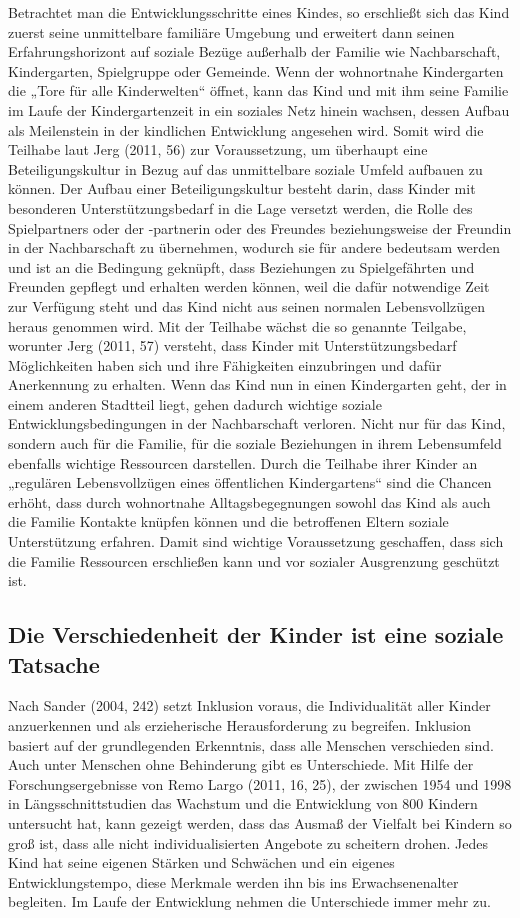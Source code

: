 Betrachtet man die Entwicklungsschritte eines Kindes, so erschließt sich das Kind zuerst seine unmittelbare familiäre Umgebung und erweitert dann seinen Erfahrungshorizont auf soziale Bezüge außerhalb der Familie wie Nachbarschaft, Kindergarten, Spielgruppe oder Gemeinde. Wenn der wohnortnahe Kindergarten die „Tore für alle Kinderwelten“ öffnet, kann das Kind und mit ihm seine Familie im Laufe der Kindergartenzeit in ein soziales Netz hinein wachsen, dessen Aufbau als Meilenstein in der kindlichen Entwicklung angesehen wird. 
Somit wird die Teilhabe laut Jerg (2011, 56) zur Voraussetzung, um überhaupt eine Beteiligungskultur in Bezug auf das unmittelbare soziale Umfeld aufbauen zu können. Der Aufbau einer Beteiligungskultur besteht darin, dass Kinder mit besonderen Unterstützungsbedarf in die Lage versetzt werden, die Rolle des Spielpartners oder der -partnerin oder des Freundes beziehungsweise der Freundin in der Nachbarschaft zu übernehmen, wodurch sie für andere bedeutsam werden und ist an die Bedingung geknüpft, dass  Beziehungen zu Spielgefährten und Freunden gepflegt und erhalten werden können, weil die dafür notwendige Zeit zur Verfügung steht und das Kind nicht aus seinen normalen Lebensvollzügen heraus genommen wird.
Mit der Teilhabe wächst die so genannte Teilgabe, worunter Jerg (2011, 57) versteht, dass Kinder mit Unterstützungsbedarf Möglichkeiten haben sich und ihre Fähigkeiten einzubringen und dafür Anerkennung zu erhalten. 
Wenn das Kind nun in einen Kindergarten geht, der in einem anderen Stadtteil liegt, gehen dadurch wichtige soziale Entwicklungsbedingungen in der Nachbarschaft verloren. Nicht nur für das Kind, sondern auch für die Familie, für die soziale Beziehungen in ihrem Lebensumfeld ebenfalls wichtige Ressourcen darstellen. Durch die Teilhabe ihrer Kinder an „regulären Lebensvollzügen eines öffentlichen Kindergartens“ sind die Chancen erhöht, dass durch wohnortnahe Alltagsbegegnungen sowohl das Kind als auch die Familie Kontakte knüpfen können und die betroffenen Eltern soziale Unterstützung erfahren. Damit sind wichtige Voraussetzung geschaffen, dass sich die Familie Ressourcen erschließen kann und vor sozialer Ausgrenzung geschützt ist. 

\subsection{Die Verschiedenheit der Kinder ist eine soziale Tatsache}\label{sec:heterogenität}
Nach Sander (2004, 242) setzt Inklusion voraus, die Individualität aller Kinder anzuerkennen und als erzieherische Herausforderung zu begreifen. Inklusion basiert auf der grundlegenden Erkenntnis, dass alle Menschen verschieden sind. Auch unter Menschen ohne Behinderung gibt es Unterschiede. Mit Hilfe der Forschungsergebnisse von Remo Largo (2011, 16, 25), der zwischen 1954 und 1998 in Längsschnittstudien das Wachstum und die Entwicklung von 800 Kindern untersucht hat, kann gezeigt werden, dass das Ausmaß der Vielfalt bei Kindern so groß ist, dass alle nicht individualisierten Angebote zu scheitern drohen. Jedes Kind hat seine eigenen Stärken und Schwächen und ein eigenes Entwicklungstempo, diese Merkmale werden ihn bis ins Erwachsenenalter begleiten. Im Laufe der Entwicklung nehmen die Unterschiede immer mehr zu. 

